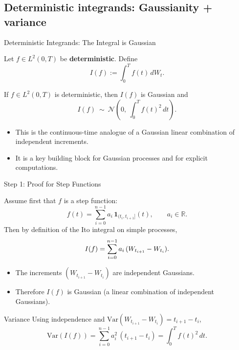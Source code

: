 \documentclass[10pt,aspectratio=169]{beamer}
\newenvironment{theoremblock}[1]{%
  \begin{theorem}[#1]%
}{%
  \end{theorem}%
}
\newcommand{\R}{\mathbb{R}}
\newcommand{\Var}{\text{Var}}
\begin{document}
\subsection{Deterministic integrands: Gaussianity + variance}

\begin{frame}{Deterministic Integrands: The Integral is Gaussian}

Let $f\in L^2(0,T)$ be \textbf{deterministic}. Define
\[
I(f):=\int_0^T f(t)\,dW_t.
\]
\pause

\begin{theoremblock}{Gaussianity + variance}
If $f\in L^2(0,T)$ is deterministic, then $I(f)$ is Gaussian and
\[
I(f)\ \sim\ \mathcal{N}\!\left(0,\ \int_0^T f(t)^2\,dt\right).
\]
\end{theoremblock}

\medskip
\begin{itemize}
  \item This is the continuous-time analogue of a Gaussian linear combination of independent increments.\pause
  \item It is a key building block for Gaussian processes and for explicit computations.\pause
\end{itemize}

\end{frame}

\begin{frame}{Step 1: Proof for Step Functions}

Assume first that $f$ is a step function:
\[
f(t)=\sum_{i=0}^{n-1} a_i\,\mathbf{1}_{(t_i,t_{i+1}]}(t),
\qquad a_i\in\R.
\]
\pause
Then by definition of the Ito integral on simple processes,
\[
I(f)=\sum_{i=0}^{n-1} a_i\,(W_{t_{i+1}}-W_{t_i}).
\vspace{-3mm}
\]
\pause

\begin{itemize}
  \item The increments $(W_{t_{i+1}}-W_{t_i})$ are independent Gaussians.\pause
  \item Therefore $I(f)$ is Gaussian (a linear combination of independent Gaussians).\pause
\end{itemize}

\medskip
\begin{block}{Variance}
Using independence and $\Var(W_{t_{i+1}}-W_{t_i})=t_{i+1}-t_i$,
\vspace{-2mm}
\[
\Var(I(f))
=
\sum_{i=0}^{n-1} a_i^2\,(t_{i+1}-t_i)
=
\int_0^T f(t)^2\,dt.
\]
\end{block}

\end{frame}
\end{document}
